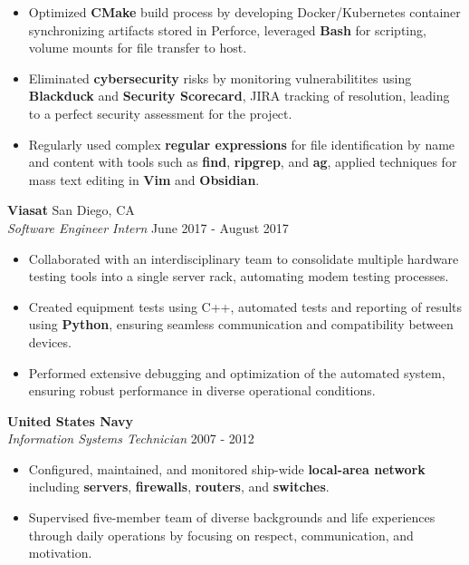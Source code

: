 \documentclass[a4paper]{article}
\begin{document}
\begin{itemize}
	\item Optimized \textbf{CMake} build process by developing Docker/Kubernetes container synchronizing artifacts stored in Perforce, leveraged \textbf{Bash} for scripting, volume mounts for file transfer to host.
	\item Eliminated \textbf{cybersecurity} risks by monitoring vulnerabilitites using \textbf{Blackduck} and \textbf{Security Scorecard}, JIRA tracking of resolution, leading to a perfect security assessment for the project.
	\item Regularly used complex \textbf{regular expressions} for file identification by name and content with tools such as \textbf{find}, \textbf{ripgrep}, and \textbf{ag}, applied techniques for mass text editing in \textbf{Vim} and \textbf{Obsidian}.
\end{itemize}

\vspace{-1mm}
\textbf{Viasat} \hfill San Diego, CA\\
\textit{Software Engineer Intern} \hfill June 2017 - August 2017\\
\vspace{-1mm}
\begin{itemize} \itemsep 1pt
    \item Collaborated with an interdisciplinary team to consolidate multiple hardware testing tools into a single server rack, automating modem testing processes.
    \item Created equipment tests using C++, automated tests and reporting of results using \textbf{Python}, ensuring seamless communication and compatibility between devices.
    \item Performed extensive debugging and optimization of the automated system, ensuring robust performance in diverse operational conditions.
\end{itemize}

\textbf{United States Navy} \hfill \\
\textit{Information Systems Technician} \hfill 2007 - 2012\\
\vspace{-1mm}
\begin{itemize} \itemsep 1pt
	\item Configured, maintained, and monitored ship-wide \textbf{local-area network} including \textbf{servers}, \textbf{firewalls}, \textbf{routers}, and \textbf{switches}.
	\item Supervised five-member team of diverse backgrounds and life experiences through daily operations by focusing on respect, communication, and motivation.
\end{itemize}
\end{document}
